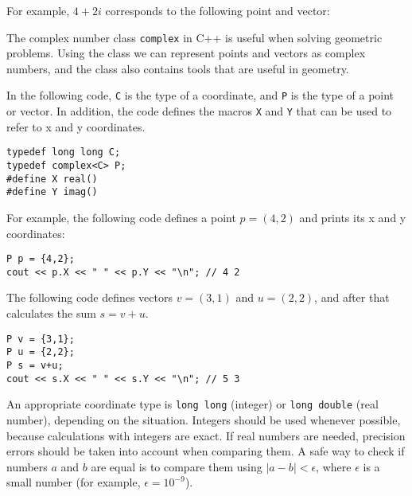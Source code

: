 For example, $4+2i$ corresponds to the
following point and vector:

\begin{center}
\end{center}


The complex number class \texttt{complex} in C++ is
useful when solving geometric problems.
Using the class we can represent points and vectors
as complex numbers, and the class also contains tools
that are useful in geometry.

In the following code, \texttt{C} is the type of
a coordinate, and \texttt{P} is the type of a point or vector.
In addition, the code defines the macros \texttt{X} and \texttt{Y}
that can be used to refer to x and y coordinates.

\begin{lstlisting}
typedef long long C;
typedef complex<C> P;
#define X real()
#define Y imag()
\end{lstlisting}

For example, the following code defines a point $p=(4,2)$
and prints its x and y coordinates:

\begin{lstlisting}
P p = {4,2};
cout << p.X << " " << p.Y << "\n"; // 4 2
\end{lstlisting}

The following code defines vectors $v=(3,1)$ and $u=(2,2)$,
and after that calculates the sum $s=v+u$.

\begin{lstlisting}
P v = {3,1};
P u = {2,2};
P s = v+u;
cout << s.X << " " << s.Y << "\n"; // 5 3
\end{lstlisting}

An appropriate coordinate type is
\texttt{long long} (integer) or \texttt{long double}
(real number), depending on the situation.
Integers should be used whenever possible,
because calculations with integers are exact.
If real numbers are needed,
precision errors should be taken into account
when comparing them.
A safe way to check if numbers $a$ and $b$ are equal
is to compare them using $|a-b|<\epsilon$,
where $\epsilon$ is a small number (for example, $\epsilon=10^{-9}$).


